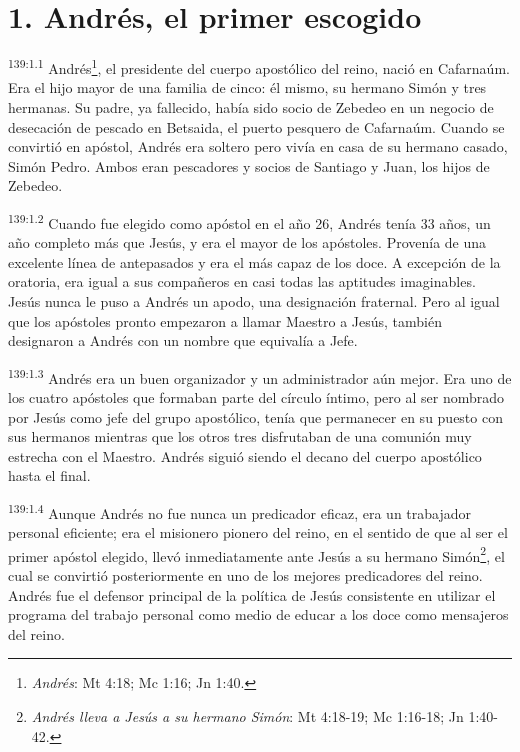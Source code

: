 \section*{1. Andrés, el primer escogido}
\par 
\textsuperscript{139:1.1} Andrés\footnote{\textit{Andrés}: Mt 4:18; Mc 1:16; Jn 1:40.}, el presidente del cuerpo apostólico del reino, nació en Cafarnaúm. Era el hijo mayor de una familia de cinco: él mismo, su hermano Simón y tres hermanas. Su padre, ya fallecido, había sido socio de Zebedeo en un negocio de desecación de pescado en Betsaida, el puerto pesquero de Cafarnaúm. Cuando se convirtió en apóstol, Andrés era soltero pero vivía en casa de su hermano casado, Simón Pedro. Ambos eran pescadores y socios de Santiago y Juan, los hijos de Zebedeo.

\par 
\textsuperscript{139:1.2} Cuando fue elegido como apóstol en el año 26, Andrés tenía 33 años, un año completo más que Jesús, y era el mayor de los apóstoles. Provenía de una excelente línea de antepasados y era el más capaz de los doce. A excepción de la oratoria, era igual a sus compañeros en casi todas las aptitudes imaginables. Jesús nunca le puso a Andrés un apodo, una designación fraternal. Pero al igual que los apóstoles pronto empezaron a llamar Maestro a Jesús, también designaron a Andrés con un nombre que equivalía a Jefe.

\par 
\textsuperscript{139:1.3} Andrés era un buen organizador y un administrador aún mejor. Era uno de los cuatro apóstoles que formaban parte del círculo íntimo, pero al ser nombrado por Jesús como jefe del grupo apostólico, tenía que permanecer en su puesto con sus hermanos mientras que los otros tres disfrutaban de una comunión muy estrecha con el Maestro. Andrés siguió siendo el decano del cuerpo apostólico hasta el final.

\par 
\textsuperscript{139:1.4} Aunque Andrés no fue nunca un predicador eficaz, era un trabajador personal eficiente; era el misionero pionero del reino, en el sentido de que al ser el primer apóstol elegido, llevó inmediatamente ante Jesús a su hermano Simón\footnote{\textit{Andrés lleva a Jesús a su hermano Simón}: Mt 4:18-19; Mc 1:16-18; Jn 1:40-42.}, el cual se convirtió posteriormente en uno de los mejores predicadores del reino. Andrés fue el defensor principal de la política de Jesús consistente en utilizar el programa del trabajo personal como medio de educar a los doce como mensajeros del reino.

